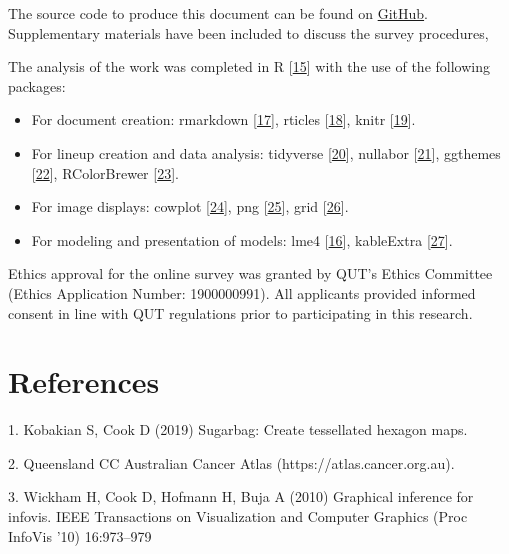 \documentclass[conference,final,]{IEEEtran}
\providecommand{\tightlist}{%
  \setlength{\itemsep}{0pt}\setlength{\parskip}{0pt}}
\begin{document}
The source code to produce this document can be found on \href{https://github.com/srkobakian/experiment/tree/master/paper}{GitHub}.
Supplementary materials have been included to discuss the survey procedures,

The analysis of the work was completed in R {[}\protect\hyperlink{ref-RCore}{15}{]} with the use of the following packages:

\begin{itemize}
\tightlist
\item
  For document creation: rmarkdown {[}\protect\hyperlink{ref-rmarkdown}{17}{]}, rticles {[}\protect\hyperlink{ref-rticles}{18}{]}, knitr {[}\protect\hyperlink{ref-knitr}{19}{]}.
\item
  For lineup creation and data analysis: tidyverse {[}\protect\hyperlink{ref-tidyverse}{20}{]}, nullabor {[}\protect\hyperlink{ref-nullabor}{21}{]}, ggthemes {[}\protect\hyperlink{ref-ggthemes}{22}{]}, RColorBrewer {[}\protect\hyperlink{ref-RColorBrewer}{23}{]}.
\item
  For image displays: cowplot {[}\protect\hyperlink{ref-cowplot}{24}{]}, png {[}\protect\hyperlink{ref-png}{25}{]}, grid {[}\protect\hyperlink{ref-grid}{26}{]}.
\item
  For modeling and presentation of models: lme4 {[}\protect\hyperlink{ref-lme4}{16}{]}, kableExtra {[}\protect\hyperlink{ref-kableExtra}{27}{]}.
\end{itemize}

Ethics approval for the online survey was granted by QUT's Ethics Committee (Ethics Application Number: 1900000991). All applicants provided informed consent in line with QUT regulations prior to participating in this research.

\newpage

\hypertarget{references-1}{%
\section{References}\label{references-1}}

\hypertarget{refs}{}
\leavevmode\hypertarget{ref-sugarbag}{}%
1. Kobakian S, Cook D (2019) Sugarbag: Create tessellated hexagon maps.

\leavevmode\hypertarget{ref-atlas}{}%
2. Queensland CC Australian Cancer Atlas (https://atlas.cancer.org.au).

\leavevmode\hypertarget{ref-GIIV}{}%
3. Wickham H, Cook D, Hofmann H, Buja A (2010) Graphical inference for infovis. IEEE Transactions on Visualization and Computer Graphics (Proc InfoVis '10) 16:973--979
\end{document}
